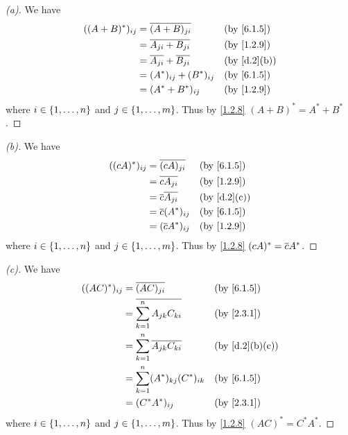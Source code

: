 \begin{proof}[(a)]
  We have
  \begin{align*}
    ((A + B)^*)_{i j} & = \conj{(A + B)_{j i}}            &  & \text{(by \cref{6.1.5})}  \\
                      & = \conj{A_{j i} + B_{j i}}        &  & \text{(by \cref{1.2.9})}  \\
                      & = \conj{A_{j i}} + \conj{B_{j i}} &  & \text{(by \cref{d.2}(b))} \\
                      & = (A^*)_{i j} + (B^*)_{i j}       &  & \text{(by \cref{6.1.5})}  \\
                      & = (A^* + B^*)_{i j}               &  & \text{(by \cref{1.2.9})}
  \end{align*}
  where \(i \in \left\lbrace1, \dots, n\right\rbrace\) and \(j \in \left\lbrace1, \dots, m\right\rbrace\).
  Thus by \cref{1.2.8} \((A + B)^* = A^* + B^*\).
\end{proof}

\begin{proof}[(b)]
  We have
  \begin{align*}
    ((cA)^*)_{i j} & = \conj{(cA)_{j i}}       &  & \text{(by \cref{6.1.5})}  \\
                   & = \conj{c A_{j i}}        &  & \text{(by \cref{1.2.9})}  \\
                   & = \conj{c} \conj{A_{j i}} &  & \text{(by \cref{d.2}(c))} \\
                   & = \conj{c} (A^*)_{i j}    &  & \text{(by \cref{6.1.5})}  \\
                   & = (\conj{c} A^*)_{i j}    &  & \text{(by \cref{1.2.9})}
  \end{align*}
  where \(i \in \left\lbrace1, \dots, n\right\rbrace\) and \(j \in \left\lbrace1, \dots, m\right\rbrace\).
  Thus by \cref{1.2.8} \((cA)^* = \overline{c} A^*\).
\end{proof}

\begin{proof}[(c)]
  We have
  \begin{align*}
    ((AC)^*)_{i j} & = \conj{(AC)_{j i}}                            &  & \text{(by \cref{6.1.5})}     \\
                   & = \conj{\sum_{k = 1}^n A_{j k} C_{k i}}        &  & \text{(by \cref{2.3.1})}     \\
                   & = \sum_{k = 1}^n \conj{A_{j k}} \conj{C_{k i}} &  & \text{(by \cref{d.2}(b)(c))} \\
                   & = \sum_{k = 1}^n (A^*)_{k j} (C^*)_{i k}       &  & \text{(by \cref{6.1.5})}     \\
                   & = (C^* A^*)_{i j}                              &  & \text{(by \cref{2.3.1})}
  \end{align*}
  where \(i \in \left\lbrace1, \dots, n\right\rbrace\) and \(j \in \left\lbrace1, \dots, m\right\rbrace\).
  Thus by \cref{1.2.8} \((AC)^* = C^* A^*\).
\end{proof}

